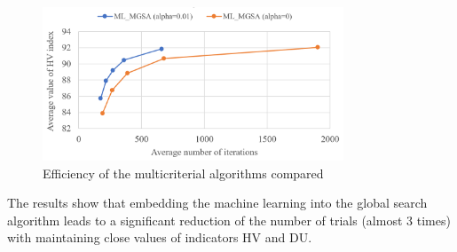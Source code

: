 \documentclass[runningheads]{llncs}
\begin{document}
\begin{figure}[ht]
\center
\includegraphics[width=0.8\textwidth]{fig2.png}
\caption{Efficiency of the multicriterial algorithms compared} \label{fig:2}
\end{figure}

\textcolor[rgb]{1,0,0}{The results show that embedding the machine learning into the global search algorithm leads to }a significant reduction of the number of trials (almost 3 times) with maintaining close values of indicators HV and DU.

%
%
%
% 
% 
%


\end{document}
